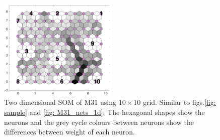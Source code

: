 \begin{figure}
        \centering
        \includegraphics[width=0.5\textwidth]{../../images0.01/M31/2D/diff_dimension/combine_2D_data_between_cols3and26.png}
    \caption{Two dimensional SOM of M31 using $10\times10$ grid. Similar to figs.\ref{fig: sample} and \ref{fig: M31_nets_1d}, The hexagonal shapes show the neurons and the grey cycle colours between neurons show the differences between weight of each neuron.}
    \label{fig: all_derived_ones}
\end{figure}